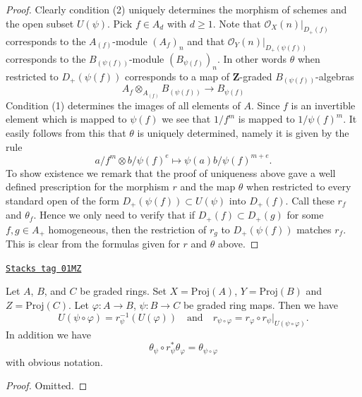 \begin{proof}
Clearly condition (2) uniquely determines the morphism of schemes
and the open subset $U(\psi)$. Pick $f \in A_d$ with $d \geq 1$.
Note that
$\mathcal{O}_X(n)|_{D_{+}(f)}$ corresponds to the
$A_{(f)}$-module $(A_f)_n$ and that
$\mathcal{O}_Y(n)|_{D_{+}(\psi(f))}$ corresponds to the
$B_{(\psi(f))}$-module $(B_{\psi(f)})_n$. In other words $\theta$
when restricted to $D_{+}(\psi(f))$ corresponds to a map of
$\mathbf{Z}$-graded $B_{(\psi(f))}$-algebras
$$
A_f \otimes_{A_{(f)}} B_{(\psi(f))}
\longrightarrow
B_{\psi(f)}
$$
Condition (1) determines the images of all elements of $A$.
Since $f$ is an invertible element which is mapped to $\psi(f)$
we see that $1/f^m$ is mapped to $1/\psi(f)^m$. It easily follows
from this that $\theta$ is uniquely determined, namely it is
given by the rule
$$
a/f^m \otimes b/\psi(f)^e \longmapsto \psi(a)b/\psi(f)^{m + e}.
$$
To show existence we remark that the proof of uniqueness above gave
a well defined prescription for the morphism $r$ and the map $\theta$
when restricted to every standard open of the form
$D_{+}(\psi(f)) \subset U(\psi)$ into $D_{+}(f)$.
Call these $r_f$ and $\theta_f$.
Hence we only need to verify that if $D_{+}(f) \subset D_{+}(g)$
for some $f, g \in A_{+}$ homogeneous, then the restriction of
$r_g$ to $D_{+}(\psi(f))$ matches $r_f$. This is clear from the
formulas given for $r$ and $\theta$ above.
\end{proof}

\begin{lemma}
\label{constructions-lemma-morphism-proj-transitive}
\href{https://stacks.math.columbia.edu/tag/01MZ}{\texttt{Stacks tag 01MZ}}

Let $A$, $B$, and $C$ be graded rings.
Set $X = \text{Proj}(A)$, $Y = \text{Proj}(B)$ and $Z = \text{Proj}(C)$.
Let $\varphi : A \to B$, $\psi : B \to C$ be graded ring maps.
Then we have
$$
U(\psi \circ \varphi) = r_\psi^{-1}(U(\varphi))
\quad
\text{and}
\quad
r_{\psi \circ \varphi}
=
r_\varphi \circ r_\psi|_{U(\psi \circ \varphi)}.
$$
In addition we have
$$
\theta_\psi \circ r_\psi^*\theta_\varphi
=
\theta_{\psi \circ \varphi}
$$
with obvious notation.
\end{lemma}

\begin{proof}
Omitted.
\end{proof}

